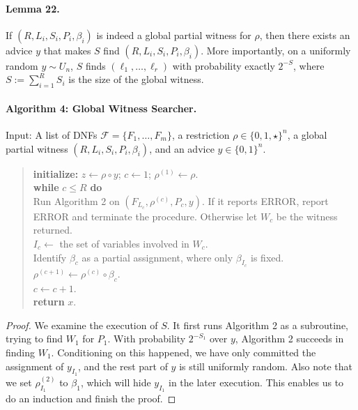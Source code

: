 \documentclass[10pt,a4paper]{article}
\begin{document}
\paragraph{Lemma 22.} If $(R,L_i,S_i,P_i,\beta_i)$ is indeed a global partial witness for $\rho$, then there exists an advice $y$ that makes $S$ find $(R,L_i,S_i,P_i,\beta_i)$. More importantly, on a uniformly random $y\sim U_n$, $S$ finds $(\ell_1,\ldots,\ell_r)$ with probability exactly $2^{-S}$, where $S:=\sum_{i=1}^RS_i$ is the size of the global witness.
\paragraph{Algorithm 4: Global Witness Searcher.} Input: A list of DNFs $\mathcal F=\{F_1,\ldots,F_m\}$, a restriction $\rho\in\{0,1,\star\}^n$, a global partial witness $(R,L_i,S_i,P_i,\beta_i)$, and an advice $y\in\{0,1\}^n$.
\begin{quote}\textbf{initialize:} $z\leftarrow\rho\circ y$; $c\leftarrow1$; $\rho^{(1)}\leftarrow\rho$.\\
\textbf{while} $c\le R$ \textbf{do}\\
\hspace*{1em}Run Algorithm 2 on $(F_{L_c},\rho^{(c)},P_c,y)$. If it reports ERROR, report ERROR and terminate the procedure. Otherwise let $W_c$ be the witness returned.\\
\hspace*{1em}$I_c\leftarrow$ the set of variables involved in $W_c$.\\
\hspace*{1em}Identify $\beta_c$ as a partial assignment, where only $\beta_{I_c}$ is fixed.\\
\hspace*{1em}$\rho^{(c+1)}\leftarrow\rho^{(c)}\circ\beta_c$.\\
\hspace*{1em}$c\leftarrow c+1$.\\
\textbf{return} $x$.\end{quote}
\begin{proof}We examine the execution of $S$. It first runs Algorithm 2 as a subroutine, trying to find $W_1$ for $P_1$. With probability $2^{-S_1}$ over $y$, Algorithm 2 succeeds in finding $W_1$. Conditioning on this happened, we have only committed the assignment of $y_{I_1}$, and the rest part of $y$ is still uniformly random. Also note that we set $\rho_{I_1}^{(2)}$ to $\beta_1$, which will hide $y_{I_1}$ in the later execution. This enables us to do an induction and finish the proof.\end{proof}
\end{document}
